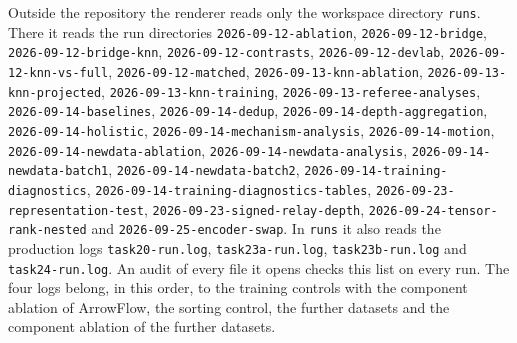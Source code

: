 {Outside the repository the renderer reads only the workspace directory \texttt{runs}. There it reads the run directories \texttt{2026-09-12-ablation}, \texttt{2026-09-12-bridge}, \texttt{2026-09-12-bridge-knn}, \texttt{2026-09-12-contrasts}, \texttt{2026-09-12-devlab}, \texttt{2026-09-12-knn-vs-full}, \texttt{2026-09-12-matched}, \texttt{2026-09-13-knn-ablation}, \texttt{2026-09-13-knn-projected}, \texttt{2026-09-13-knn-training}, \texttt{2026-09-13-referee-analyses}, \texttt{2026-09-14-baselines}, \texttt{2026-09-14-dedup}, \texttt{2026-09-14-depth-aggregation}, \texttt{2026-09-14-holistic}, \texttt{2026-09-14-mechanism-analysis}, \texttt{2026-09-14-motion}, \texttt{2026-09-14-newdata-ablation}, \texttt{2026-09-14-newdata-analysis}, \texttt{2026-09-14-newdata-batch1}, \texttt{2026-09-14-newdata-batch2}, \texttt{2026-09-14-training-diagnostics}, \texttt{2026-09-14-training-diagnostics-tables}, \texttt{2026-09-23-representation-test}, \texttt{2026-09-23-signed-relay-depth}, \texttt{2026-09-24-tensor-rank-nested} and \texttt{2026-09-25-encoder-swap}. In \texttt{runs} it also reads the production logs \texttt{task20-run.log}, \texttt{task23a-run.log}, \texttt{task23b-run.log} and \texttt{task24-run.log}. An audit of every file it opens checks this list on every run. The four logs belong, in this order, to the training controls with the component ablation of ArrowFlow, the sorting control, the further datasets and the component ablation of the further datasets.\par}
